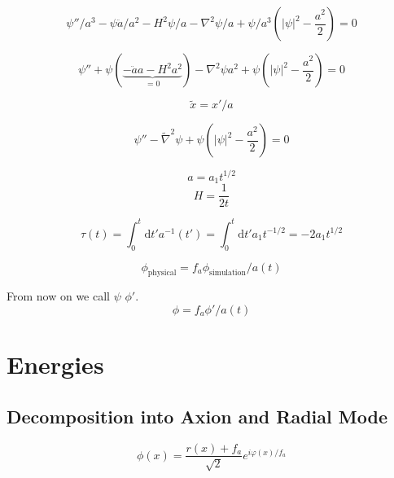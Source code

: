 \documentclass[a4paper]{article}
\begin{document}
\begin{equation}
    \psi'' / a^3 - \psi \ddot{a} / a^2 - H^2 \psi / a
    - \nabla^2 \psi / a + \psi / a^3 ( |\psi|^2 - \frac{a^2}{2} ) = 0
\end{equation}

\begin{equation}
    \psi'' + \psi (\underbrace{- \ddot{a} a - H^2 a^2}_{= 0})
    - \nabla^2 \psi a^2 + \psi ( |\psi|^2 - \frac{a^2}{2} ) = 0
\end{equation}

\begin{equation}
    \tilde{x} = x' / a
\end{equation}

\begin{equation}
    \psi'' - \tilde{\nabla}^2 \psi + \psi ( |\psi|^2 - \frac{a^2}{2} ) = 0
\end{equation}

\begin{equation}
    a = a_1 t^{1/2}
\end{equation}
\begin{equation}
    H = \frac{1}{2t}
\end{equation}

\begin{equation}
    \tau(t) = \int_0^t \mathrm{d} t' a^{-1}(t') = \int_0^t \mathrm{d} t' a_1 t^{-1/2} = -2 a_1 t^{1/2}
\end{equation}

\begin{equation}
    \phi_\mathrm{physical} = f_a \phi_\mathrm{simulation} / a(t)
\end{equation}

From now on we call $\psi$ $\phi'$.
\begin{equation}
    \phi= f_a \phi' / a(t)
\end{equation}

\section{Energies}

\subsection{Decomposition into Axion and Radial Mode}
\begin{equation}
    \phi(x) = \frac{r(x) + f_a}{\sqrt{2}} e^{i \varphi(x) / f_a }
\end{equation}
\end{document}
